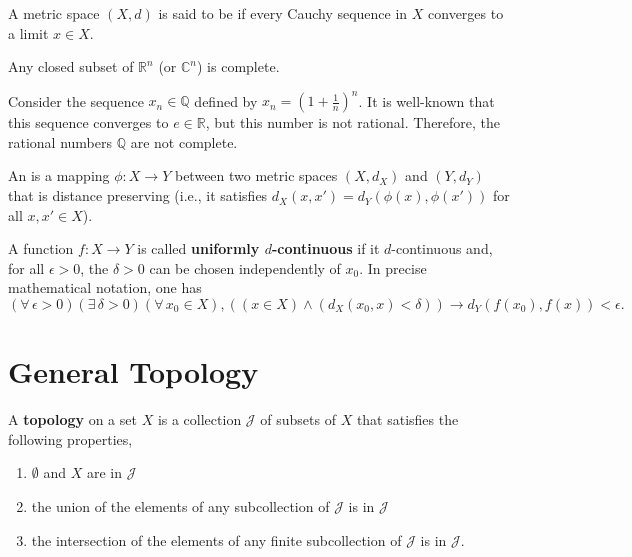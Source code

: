 \begin{definition}
A metric space $(X,d)$ is said to be  if every Cauchy sequence in $X$ converges to a limit $x \in X$.
\end{definition}

\begin{example}
Any closed subset of $\mathbb{R}^n$ (or $\mathbb{C}^n$) is complete.
\end{example}

\begin{example}
Consider the sequence $x_n \in \mathbb{Q}$ defined by $x_n = \left( 1 + \frac{1}{n} \right)^n$.
It is well-known that this sequence converges to $e\in \mathbb{R}$, but this number is not rational.
Therefore, the rational numbers $\mathbb{Q}$ are not complete.
\end{example}

\begin{definition}
An  is a mapping $\phi : X \rightarrow Y$ between two metric spaces $(X,d_X)$ and $(Y,d_Y)$ that is distance preserving (i.e., it satisfies $d_X (x,x') = d_Y \left(\phi(x),\phi(x')\right)$ for all $x,x'\in X$).
\end{definition}

\begin{definition}
A function $f : X \rightarrow Y$ is called \textbf{uniformly $d$-continuous} if it $d$-continuous and, for all $\epsilon > 0$, the $\delta >0$ can be chosen independently of $x_0$.
In precise mathematical notation, one has
\[ (\forall \, \epsilon >0) ( \exists \, \delta >0) (\forall \, x_0 \in X), \left( (x\in X) \wedge (d_X(x_0,x)< \delta) \right) \rightarrow  d_Y \left( f(x_0),f(x) \right) < \epsilon. \]
\end{definition}


\section{General Topology}

\begin{definition}
A \textbf{topology} on a set $X$ is a collection $\mathcal{J}$ of subsets of $X$ that satisfies the following properties,
\begin{enumerate}
\item $\emptyset$ and $X$ are in $\mathcal{J}$
\item the union of the elements of any subcollection of $\mathcal{J}$ is in $\mathcal{J}$
\item the intersection of the elements of any finite subcollection of $\mathcal{J}$ is in $\mathcal{J}$.
\end{enumerate}
\end{definition}

